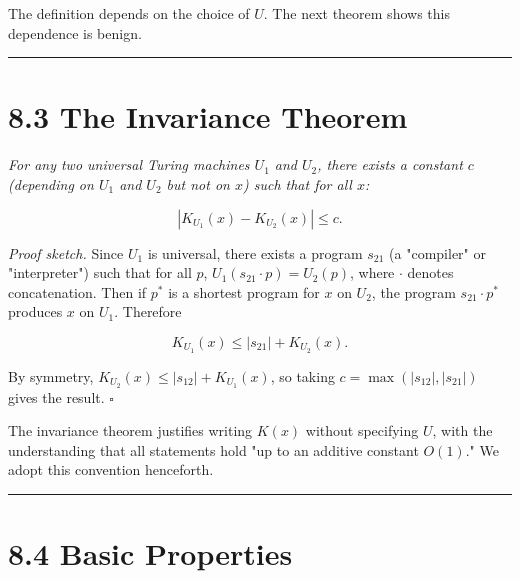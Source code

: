 \begin{remark}
The definition depends on the choice of $U$. The next theorem shows this dependence is benign.

\bigskip\hrule\bigskip
\end{remark}

\section{8.3 The Invariance Theorem}

\begin{theorem}
\textit{For any two universal Turing machines $U_1$ and $U_2$, there exists a constant $c$ (depending on $U_1$ and $U_2$ but not on $x$) such that for all $x$:}

\[
|K_{U_1}(x) - K_{U_2}(x)| \leq c.
\]

\textit{Proof sketch.} Since $U_1$ is universal, there exists a program $s_{21}$ (a "compiler" or "interpreter") such that for all $p$, $U_1(s_{21} \cdot p) = U_2(p)$, where $\cdot$ denotes concatenation. Then if $p^*$ is a shortest program for $x$ on $U_2$, the program $s_{21} \cdot p^*$ produces $x$ on $U_1$. Therefore

\[
K_{U_1}(x) \leq |s_{21}| + K_{U_2}(x).
\]

By symmetry, $K_{U_2}(x) \leq |s_{12}| + K_{U_1}(x)$, so taking $c = \max(|s_{12}|, |s_{21}|)$ gives the result. $\square$

The invariance theorem justifies writing $K(x)$ without specifying $U$, with the understanding that all statements hold "up to an additive constant $O(1)$." We adopt this convention henceforth.

\bigskip\hrule\bigskip
\end{theorem}

\section{8.4 Basic Properties}


